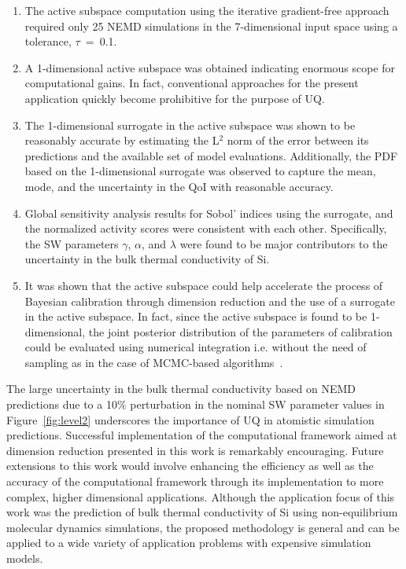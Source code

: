 \begin{enumerate}
\item The active subspace computation using the iterative gradient-free approach
required only 25 NEMD simulations in the 7-dimensional input space using a tolerance, 
$\tau$~=~0.1.

\item A 1-dimensional active subspace was obtained indicating enormous scope for
computational gains. In fact, conventional
approaches for the present application quickly become prohibitive for
the purpose of UQ. 

\item The 1-dimensional surrogate in the active subspace was shown to be reasonably accurate
by estimating the L$^2$ norm of the error between its predictions and the available set of
model evaluations. Additionally, the PDF based on the 1-dimensional surrogate was 
observed to capture the mean, mode, and the uncertainty in the QoI with reasonable accuracy.

\item Global sensitivity analysis results for Sobol' indices using the surrogate, and the
normalized activity scores were consistent with each other. Specifically, the SW parameters
$\gamma$, $\alpha$, and $\lambda$ were found to be major contributors to the
uncertainty in the bulk thermal conductivity of Si.

\item It was shown that the active subspace could help accelerate the process
of Bayesian calibration through dimension reduction and the use of a surrogate 
in the active subspace. In fact, since the active subspace is found to be 1-dimensional,
the joint posterior distribution of the parameters of calibration could be evaluated
using numerical integration i.e. without the need of sampling as in the case of 
MCMC-based algorithms~\cite{Sankararaman:2012}. 

\end{enumerate}
%
The large uncertainty in the bulk thermal conductivity based on NEMD predictions due to
a 10$\%$ perturbation in the nominal SW parameter values in Figure~\ref{fig:level2} underscores
the importance of UQ in atomistic simulation predictions. Successful implementation of the
computational framework aimed at dimension reduction presented in this work is remarkably
encouraging. Future extensions to this work would involve enhancing the efficiency as well
as the accuracy of the computational framework through its implementation to more complex,
higher dimensional applications. Although the application focus of this work was the prediction of
bulk thermal conductivity of Si using non-equilibrium molecular dynamics simulations, the proposed
methodology is general and can be applied to a wide variety of application problems with expensive 
simulation models. 
